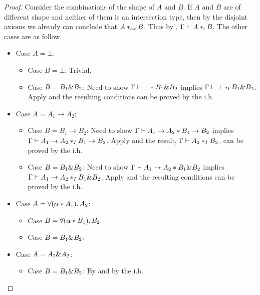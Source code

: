 \begin{proof}

  Consider the combinations of the shape of $A$ and $B$. If $A$ and $B$ are of
  different shape and neither of them is an intersection type, then by the
  disjoint axioms we already can conclude that $A *_\textnormal{ax} B$. Thus by
  , $\Gamma \vdash A *_\textnormal{i} B$. The other cases are as
  follow.

  \begin{itemize}
    \item Case $A = \bot$:
    \begin{itemize}
      \item Case $B = \bot$: Trivial.

      \item Case $B = B_1 \& B_2$: Need to show $\Gamma \vdash \bot * B_1
      \& B_2$ implies $\Gamma \vdash \bot *_\textnormal{i} B_1 \& B_2$. Apply
       and the resulting conditions can be proved by
      the i.h.
    \end{itemize}

    \item Case $A = A_1 \to A_2$:

    \begin{itemize}

      \item Case $B = B_1 \to B_2$:
      Need to show $\Gamma \vdash A_1 \to A_2 * B_1 \to B_2$ implies
      $\Gamma \vdash  A_1 \to A_2 *_I B_1 \to B_2$. Apply
       and the result, $\Gamma \vdash A_2 *_I B_2$,
      can be proved by the i.h.

      \item Case $B = B_1 \& B_2$: Need to show $\Gamma \vdash A_1 \to
      A_2 * B_1 \& B_2$ implies $\Gamma \vdash A_1 \to A_2 *_I B_1
      \& B_2$. Apply  and the resulting
      conditions can be proved by the i.h.

    \end{itemize}
    \item Case $A = \forall (\alpha * A_1).\, A_2$:

    \begin{itemize}
      \item Case $B = \forall (\alpha * B_1).\, B_2$

      \item Case $B = B_1 \& B_2$:
    \end{itemize}

    \item Case $A = A_1 \& A_2$:

    \begin{itemize}
      \item Case $B = B_1 \& B_2$: By  and by the i.h.
    \end{itemize}

  \end{itemize}
\end{proof}
